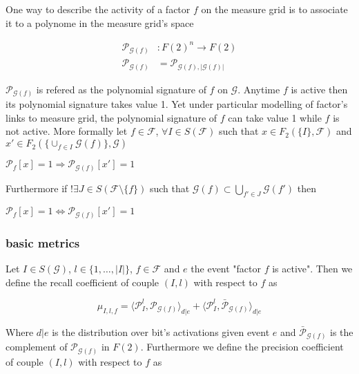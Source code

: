 \documentclass[a4paper, 11pt]{article}
\begin{document}
One way to describe the activity of a factor $f$ on the measure grid is to associate it to a polynome in the measure grid's space

\begin{align*}
\mathcal{P}_{\mathcal{G}(f)} &: F(2)^n \rightarrow F(2)\\
 \mathcal{P}_{\mathcal{G}(f)} &=  \mathcal{P}_{\mathcal{G}(f), \vert \mathcal{G}(f) \vert}
\end{align*}

$\mathcal{P}_{\mathcal{G}(f)}$ is refered as the polynomial signature of $f$ on $\mathcal{G}$. Anytime $f$ is active then  its polynomial signature takes value 1. Yet under particular modelling of factor's links to measure grid, the polynomial signature of $f$ can take value 1 while $f$ is not active. More formally let $f \in \mathcal{F}$,  $\forall I \in S(\mathcal{F})$ such that $x \in F_2(\{I\}, \mathcal{F})$ and $x' \in F_2(\{\cup_{f \in I} \mathcal{G}(f) \}, \mathcal{G})$
\begin{center}
$\mathcal{P}_f[x] = 1 \Rightarrow \mathcal{P}_{\mathcal{G}(f)}[x'] = 1$
\end{center}

Furthermore if $!\exists J \in S(\mathcal{F} \setminus \{ f \})$ such that $\mathcal{G}(f) \subset \bigcup_{f' \in J} \mathcal{G}(f')$ then

\begin{center}
$\mathcal{P}_f[x] = 1 \Leftrightarrow \mathcal{P}_{\mathcal{G}(f)}[x'] = 1$
\end{center}

\subsubsection*{basic metrics}

Let $I \in S(\mathcal{G})$, $l \in \{ 1, \ldots, \vert I \vert \}$, $f \in \mathcal{F}$ and $e$ the event "factor $f$ is active". Then we define the recall coefficient of couple $(I, l)$ with respect to $f$ as

\begin{equation*}
\mu_{I, l, f} = \langle \mathcal{P}^{l}_{I}, \mathcal{P}_{\mathcal{G}(f)} \rangle_{d \vert e} + \langle \mathcal{P}^{l}_{I}, \bar{\mathcal{P}}_{\mathcal{G}(f)} \rangle_{d \vert e}
\end{equation*}

Where $d \vert e$ is the  distribution over bit's activations given event $e$ and $\bar{\mathcal{P}}_{\mathcal{G}(f)}$ is the complement of $\mathcal{P}_{\mathcal{G}(f)}$ in $F(2)$. Furthermore we define the precision coefficient of couple $(I, l)$ with respect to $f$ as
\end{document}
